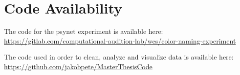 \chapter{Code Availability} %
\label{code_availability} %

The code for the psynet experiment is available here: \\
\url{https://gitlab.com/computational-audition-lab/wcs/color-naming-experiment}

The code used in order to clean, analyze and visualize data is available here: \\
\url{https://github.com/jakobpete/MasterThesisCode}